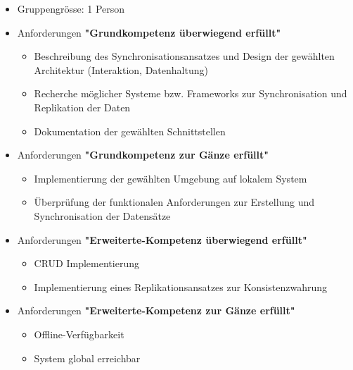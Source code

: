 \begin{itemize}
	\item Gruppengrösse: 1 Person
	\item Anforderungen \textbf{"Grundkompetenz überwiegend erfüllt"}
	\begin{itemize}
		\item Beschreibung des Synchronisationsansatzes und Design der gewählten Architektur (Interaktion, Datenhaltung)
		\item 	Recherche möglicher Systeme bzw. Frameworks zur Synchronisation und Replikation der Daten
		\item Dokumentation der gewählten Schnittstellen
	\end{itemize}
	\item Anforderungen \textbf{"Grundkompetenz zur Gänze erfüllt"}
	\begin{itemize}
		\item Implementierung der gewählten Umgebung auf lokalem System
		\item Überprüfung der funktionalen Anforderungen zur Erstellung und Synchronisation der Datensätze
	\end{itemize}
	\item Anforderungen \textbf{"Erweiterte-Kompetenz überwiegend erfüllt"}
	\begin{itemize}
		\item CRUD Implementierung
		\item Implementierung eines Replikationsansatzes zur Konsistenzwahrung
	\end{itemize}
	\item Anforderungen \textbf{"Erweiterte-Kompetenz zur Gänze erfüllt"}
	\begin{itemize}
		\item Offline-Verfügbarkeit
		\item System global erreichbar
	\end{itemize}	
\end{itemize}

\clearpage
